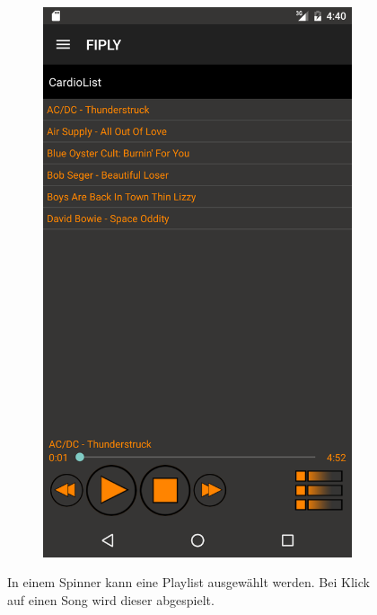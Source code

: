 \documentclass[FIPLY_base.tex]{subfiles}
\begin{document}
\begin{figure}[h]
\begin{subfigure}[b]{0.3\textwidth}
	\end{subfigure}
	\hfil
	\begin{subfigure}[b]{0.3\textwidth}
	\includegraphics[scale=0.17]{img/musicListenView2}
	\end{subfigure}
	\caption{In einem Spinner kann eine Playlist ausgewählt werden. Bei Klick auf einen Song wird dieser abgespielt.}
\end{figure}
\end{document}
